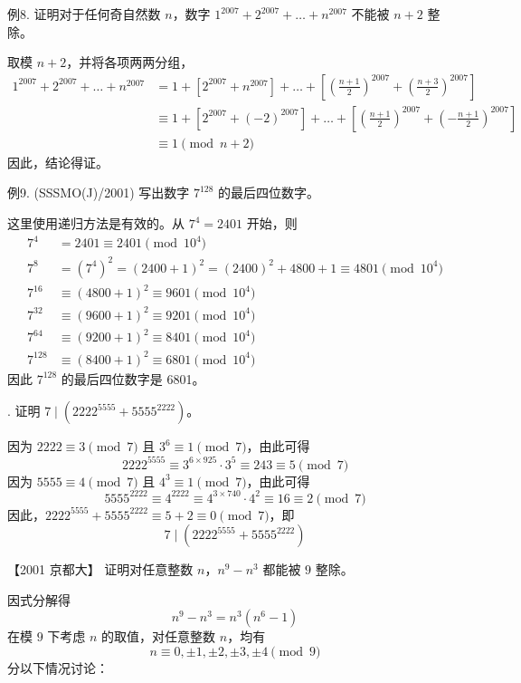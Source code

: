\begin{questions}
\question 例8. 证明对于任何奇自然数 $n$，数字 $1^{2007} + 2^{2007} + \dots + n^{2007}$ 不能被 $n + 2$ 整除。
\begin{solution}
取模 $n + 2$，并将各项两两分组，
\begin{align*}
1^{2007} + 2^{2007} + \dots + n^{2007} &= 1 + \left[2^{2007} + n^{2007}\right] + \dots + \left[\left(\frac{n+1}{2}\right)^{2007} + \left(\frac{n+3}{2}\right)^{2007}\right] \\
&\equiv 1 + \left[2^{2007} + (-2)^{2007}\right] + \dots + \left[\left(\frac{n+1}{2}\right)^{2007} + \left(-\frac{n+1}{2}\right)^{2007}\right] \\
&\equiv 1 \pmod{n + 2}
\end{align*}
因此，结论得证。
\end{solution}

\question 例9. (SSSMO(J)/2001) 写出数字 $7^{128}$ 的最后四位数字。
\begin{solution}
这里使用递归方法是有效的。从 $7^4 = 2401$ 开始，则
\begin{align*}
7^4 &= 2401 \equiv 2401 \pmod{10^4} \\
7^8 &= (7^4)^2 = (2400 + 1)^2 = (2400)^2 + 4800 + 1 \equiv 4801 \pmod{10^4} \\
7^{16} &\equiv (4800 + 1)^2 \equiv 9601 \pmod{10^4} \\
7^{32} &\equiv (9600 + 1)^2 \equiv 9201 \pmod{10^4} \\
7^{64} &\equiv (9200 + 1)^2 \equiv 8401 \pmod{10^4} \\
7^{128} &\equiv (8400 + 1)^2 \equiv 6801 \pmod{10^4}
\end{align*}
因此 $7^{128}$ 的最后四位数字是 6801。
\end{solution}

. 证明 $7 \mid (2222^{5555} + 5555^{2222})$。
\begin{solution}
因为 $2222 \equiv 3 \pmod 7$ 且 $3^6 \equiv 1 \pmod 7$，由此可得
\[
2222^{5555} \equiv 3^{6 \times 925} \cdot 3^5 \equiv 243 \equiv 5 \pmod 7
\]
因为 $5555 \equiv 4 \pmod 7$ 且 $4^3 \equiv 1 \pmod 7$，由此可得
\[
5555^{2222} \equiv 4^{2222} \equiv 4^{3 \times 740} \cdot 4^2 \equiv 16 \equiv 2 \pmod 7
\]
因此，$2222^{5555} + 5555^{2222} \equiv 5 + 2 \equiv 0 \pmod 7$，即
\[
7 \mid (2222^{5555} + 5555^{2222})
\]
\end{solution}

\question
【2001 京都大】
证明对任意整数 $n$，$n^9-n^3$ 都能被 $9$ 整除。
\begin{solution}
因式分解得
\[
n^9 - n^3 = n^3(n^6 - 1)
\]
在模 $9$ 下考虑 $n$ 的取值，对任意整数 $n$，均有
\[
n \equiv 0, \pm 1, \pm 2, \pm 3, \pm 4 \pmod 9
\]
分以下情况讨论：


\end{solution}
\end{questions}

